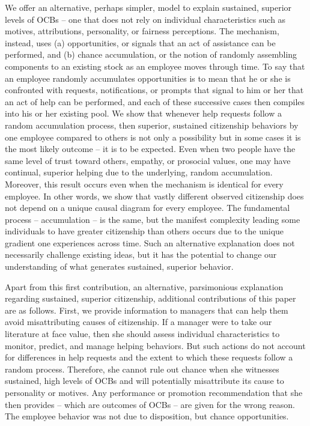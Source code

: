 \documentclass[english,,man]{apa6}
\theoremstyle{definition}
\theoremstyle{definition}
\theoremstyle{definition}
\theoremstyle{remark}
\begin{document}
We offer an alternative, perhaps simpler, model to explain sustained,
superior levels of OCBs -- one that does not rely on individual
characteristics such as motives, attributions, personality, or fairness
perceptions. The mechanism, instead, uses (a) opportunities, or signals
that an act of assistance can be performed, and (b) chance accumulation,
or the notion of randomly assembling components to an existing stock as
an employee moves through time. To say that an employee randomly
accumulates opportunities is to mean that he or she is confronted with
requests, notifications, or prompts that signal to him or her that an
act of help can be performed, and each of these successive cases then
compiles into his or her existing pool. We show that whenever help
requests follow a random accumulation process, then superior, sustained
citizenship behaviors by one employee compared to others is not only a
possibility but in some cases it is the most likely outcome -- it is to
be expected. Even when two people have the same level of trust toward
others, empathy, or prosocial values, one may have continual, superior
helping due to the underlying, random accumulation. Moreover, this
result occurs even when the mechanism is identical for every employee.
In other words, we show that vastly different observed citizenship does
not depend on a unique causal diagram for every employee. The
fundamental process -- accumulation -- is the same, but the manifest
complexity leading some individuals to have greater citizenship than
others occurs due to the unique gradient one experiences across time.
Such an alternative explanation does not necessarily challenge existing
ideas, but it has the potential to change our understanding of what
generates sustained, superior behavior.

Apart from this first contribution, an alternative, parsimonious
explanation regarding sustained, superior citizenship, additional
contributions of this paper are as follows. First, we provide
information to managers that can help them avoid misattributing causes
of citizenship. If a manager were to take our literature at face value,
then she should assess individual characteristics to monitor, predict,
and manage helping behaviors. But such actions do not account for
differences in help requests and the extent to which these requests
follow a random process. Therefore, she cannot rule out chance when she
witnesses sustained, high levels of OCBs and will potentially
misattribute its cause to personality or motives. Any performance or
promotion recommendation that she then provides -- which are outcomes of
OCBs -- are given for the wrong reason. The employee behavior was not
due to disposition, but chance opportunities.
\end{document}
